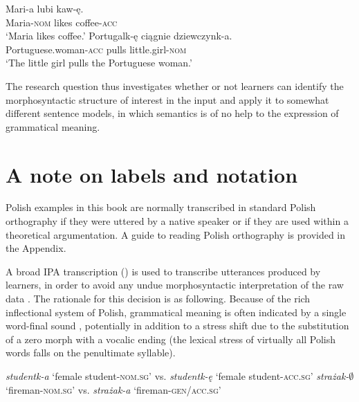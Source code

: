 \ea%
    \label{ex:01:6}
    \ea\label{ex:01:6a}
    \gll    Mari-a lubi kaw-ę.\\
            Maria-\textsc{nom}  likes  coffee-\textsc{acc}\\
    \glt    ‘Maria likes coffee.’
    \ex\label{ex:01:6b}
    \gll    Portugalk-ę ciągnie dziewczynk-a.\\
            Portuguese.woman-\textsc{acc}   pulls     little.girl-\textsc{nom}\\
    \glt    ‘The little girl pulls the Portuguese woman.’
    \z
\z

The research question thus investigates whether or not learners can identify the morphosyntactic structure of interest in the input and apply it to somewhat different sentence models, in which semantics is of no help to the expression of grammatical meaning.

\section{A note on labels and notation}\label{sec:01:5}

Polish examples in this book are normally transcribed in standard Polish orthography if they were uttered by a native speaker or if they are used within a theoretical argumentation. A guide to reading Polish orthography is provided in the Appendix. 

A broad IPA transcription (\citealt{LandauEtAl1999, Jassem2003}) is used to transcribe utterances produced by learners, in order to avoid any undue morphosyntactic interpretation of the raw data \citep{Saturno2015}. The rationale for this decision is as following. Because of the rich inflectional system of Polish, grammatical meaning is often indicated by a single word-final sound , potentially in addition to a stress shift  due to the substitution of a zero morph with a vocalic ending (the lexical stress of virtually all Polish words falls on the penultimate syllable).

\ea%
    \label{ex:01:7}
    \ea\label{ex:01:7a}
    \textit{studentk-a} ‘female student-\textsc{nom.sg’} vs. \textit{studentk-ę} ‘female student-\textsc{acc.sg’}
    \ex\label{ex:01:7b}
    \textit{strażak-${\emptyset}$} ‘fireman-\textsc{nom.sg’} vs. \textit{strażak-a} ‘fireman-\textsc{gen/acc.sg’}
    \z
\z

